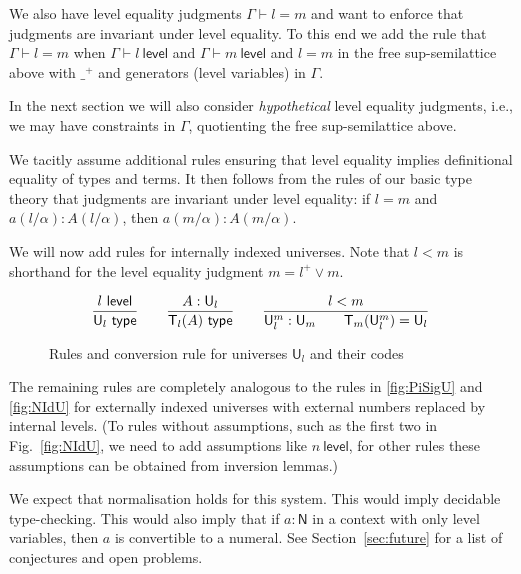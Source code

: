 \documentclass[11pt,a4paper]{article}
\theoremstyle{definition}
\newcommand{\NN}{\mathsf{N}}
\newcommand{\UU}{\mathsf{U}}
\newcommand{\Level}{\mathsf{level}}
\newcommand{\type}{\mathsf{type}}
\newcommand{\T}{\mathsf{T}}
\newcommand{\ua}{\mathsf{ua}}
\newcommand{\UA}{\mathsf{UA}}
\begin{document}
We also have level equality judgments $\Gamma\vdash l = m$ 
and want to enforce that judgments are invariant under level equality. 
To this end we add the rule that $\Gamma\vdash l = m$
when $\Gamma\vdash l~\Level$ and $\Gamma\vdash m~\Level$ and
$l=m$ in the free sup-semilattice above with $\_^+$ and generators 
(level variables) in $\Gamma$. 

In the next section we will also consider \emph{hypothetical} level 
equality judgments, i.e., we may have constraints in $\Gamma$,
quotienting the free sup-semilattice above.

We tacitly assume additional %
rules ensuring that level equality 
implies definitional equality of types and terms.
It then follows from the rules of our basic type theory that
judgments are invariant under level equality: if $l=m$ and
${a(l/\alpha) : A(l/\alpha)}$, then ${a(m/\alpha) : A(m/\alpha)}$.

We will now add rules for internally indexed universes.
Note that $l<m$ is shorthand for the level equality judgment 
$m= l^+ \vee m$.
\begin{figure}[H]
  \caption{Rules and conversion rule for universes $\UU_l$ and their codes}\label{fig:typeUl}
$$
\frac{l~\Level}{\UU_l~\type}~~~~~~
\frac{A:\UU_{l}}{\T_{l}(A)~\type}~~~~~~
\frac{l<m}{\UU^{m}_{l}:\UU_{m}~~~~~~\T_{m}({\UU^{m}_{l}}) = \UU_{l}}
\belowdisplayshortskip 0pt
$$
\end{figure}

The remaining rules are completely analogous to the rules in
\cref{fig:PiSigU} and \cref{fig:NIdU}
for externally indexed universes with external numbers replaced
by internal levels. (To rules without assumptions, such as the first two
in Fig.~\ref{fig:NIdU}, we need to add assumptions like $n~\Level$,
for other rules these assumptions can be obtained from inversion lemmas.)

 We expect that normalisation holds for this system.
 This would imply decidable type-checking. 
 This would also imply that if $a : \NN$ in a context with only 
 level variables, then $a$ is convertible to a numeral.
 See Section~\ref{sec:future} for a list of conjectures and open problems.

\end{document}
